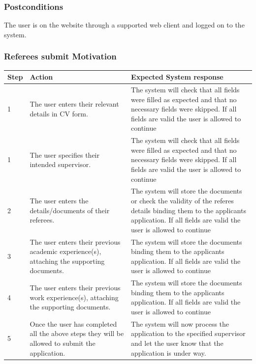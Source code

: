 \documentclass[12pt]{article}
\begin{document}
\subsubsection*{Postconditions}
The user is on the website through a supported web client and logged on to the system.

\subsubsection{Referees submit Motivation}

\begin{center}
\begin{tabular}{|l|p{6cm}|p{8cm}|}
\hline
Step & Action & Expected System response \\
\hline
1 & The user enters their relevant details in CV form.  & The system will check that all fields were filled as expected and that no necessary fields were skipped. If all fields are valid the user is allowed to continue \\
\hline
1 & The user specifies their intended supervisor.  & The system will check that all fields were filled as expected and that no necessary fields were skipped. If all fields are valid the user is allowed to continue \\
\hline
2 & The user enters the details/documents of their referees.  & The system will store the documents or check the validity of the referes details binding them to the applicants application. If all fields are valid the user is allowed to continue \\
\hline
3 & The user enters their previous academic experience(s), attaching the supporting documents.  & The system will store the documents binding them to the applicants application. If all fields are valid the user is allowed to continue \\
\hline
4 & The user enters their previous work experience(s), attaching the supporting documents.  & The system will store the documents binding them to the applicants application. If all fields are valid the user is allowed to continue \\
5 & Once the user has completed all the above steps they will be allowed to submit the application.  & The system will now process the application to the specified supervisor and let the user know that the application is under way. \\
\hline
\end{tabular}
\end{center}
\end{document}
